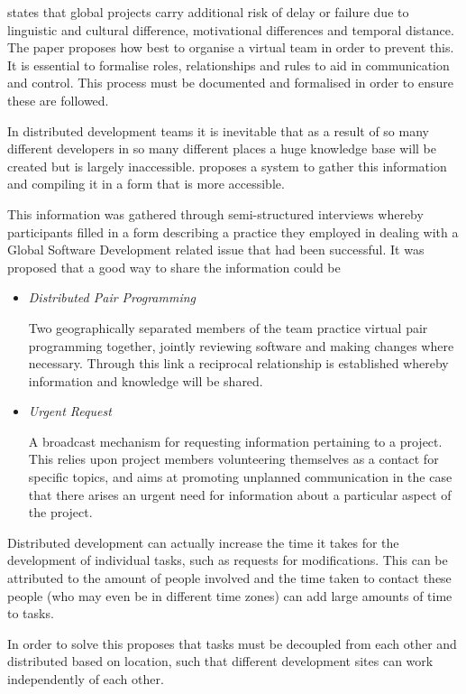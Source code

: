 \documentclass{l4proj}
\begin{document}
\citet{casey10virtual} states that global projects carry additional risk of delay or failure due to linguistic and cultural difference, motivational differences and temporal distance.  The paper proposes how best to organise a virtual team in order to prevent this.  It is essential to formalise roles, relationships and rules to aid in communication and control.  This process must be documented and formalised in order to ensure these are followed. 

In distributed development teams it is inevitable that as a result of so many different developers in so many different places a huge knowledge base will be created but is largely inaccessible.  \citet{bass07collaborative} proposes a system to gather this information and compiling it in a form that is more accessible.

This information was gathered through semi-structured interviews whereby participants filled in a form describing a practice they employed in dealing with a Global Software Development related issue that had been successful.  It was proposed that a good way to share the information could be

\begin{itemize}
\item \textit{Distributed Pair Programming} \par
Two geographically separated members of the team practice virtual pair programming together, jointly reviewing software and making changes where necessary.  Through this link a reciprocal relationship is established whereby information and knowledge will be shared.
\item\textit{Urgent Request} \par
A broadcast mechanism for requesting information pertaining to a project.  This relies upon project members volunteering themselves as a contact for specific topics, and aims at promoting unplanned communication in the case that there arises an urgent need for information about a particular aspect of the project.
\end{itemize}


Distributed development can actually increase the time it takes for the development of individual tasks, such as requests for modifications.  This can be attributed to the amount of people involved and the time taken to contact these people (who may even be in different time zones) can add large amounts of time to tasks.  

In order to solve this \citet{herbsleb03empirical} proposes that tasks must be decoupled from each other and distributed based on location, such that different development sites can work independently of each other.
\end{document}
